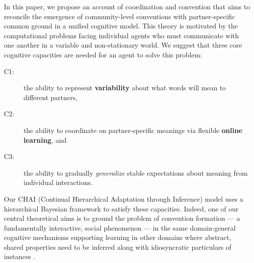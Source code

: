 In this paper, we propose an account of coordination and convention that aims to reconcile the emergence of community-level conventions with partner-specific common ground in a unified cognitive model.
This theory is motivated by the computational problems facing individual agents who must communicate with one another in a variable and non-stationary world. 
We suggest that three core cognitive capacities are needed for an agent to solve this problem:
\begin{description}
\item[C1:] the ability to represent \textbf{variability} about what words will mean to different partners,
\item[C2:] the ability to coordinate on partner-specific meanings via flexible \textbf{online learning}, and
\item[C3:] the ability to gradually \emph{generalize} stable expectations about meaning from individual interactions.
\end{description}
Our CHAI (Continual Hierarchical Adaptation through Inference) model uses a hierarchical Bayesian framework to satisfy these capacities.
Indeed, one of our central theoretical aims is to ground the problem of convention formation --- a fundamentally interactive, social phenomenon --- in the same domain-general cognitive mechanisms supporting learning in other domains where abstract, shared properties need to be inferred along with idiosyncratic particulars of instances \cite{berniker2008estimating,GoodmanUllmanTenenbaum11_TheoryOfCausality,tenenbaum_how_2011,kleinschmidt2015robust}.


